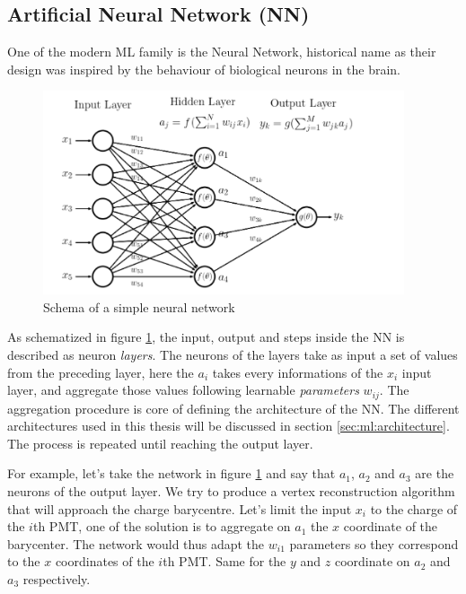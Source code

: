 \documentclass[../main.tex]{subfiles}
\begin{document}
\subsection{Artificial Neural Network (NN)}
\label{sec:ml:nn}

One of the modern ML family is the Neural Network, historical name as their design was inspired by the behaviour of biological neurons in the brain.
\begin{figure}[ht]
  \centering
  \includegraphics[height=6cm]{images/ml/nn_explications.png}
  \caption{Schema of a simple neural network}
  \label{fig:ml:schema_nn}
\end{figure}
As schematized in figure \ref{fig:ml:schema_nn}, the input, output and steps inside the NN is described as neuron \textit{layers}. The neurons of the layers take as input a set of values from the preceding layer, here the $a_i$ takes every informations of the $x_i$ input layer, and aggregate those values following learnable \textit{parameters} $w_{ij}$. The aggregation procedure is core of defining the architecture of the NN. The different architectures used in this thesis will be discussed in section \ref{sec:ml:architecture}. The process is repeated until reaching the output layer.

For example, let's take the network in figure \ref{fig:ml:schema_nn} and say that $a_1$, $a_2$ and $a_3$ are the neurons of the output layer. We try to produce a vertex reconstruction algorithm that will approach the charge barycentre. Let's limit the input $x_i$ to the charge of the $i$th PMT, one of the solution is to aggregate on $a_1$ the $x$ coordinate of the barycenter. The network would thus adapt the $w_{i1}$ parameters so they correspond to the $x$ coordinates of the $i$th PMT. Same for the $y$ and $z$ coordinate on $a_2$ and $a_3$ respectively.
\end{document}
